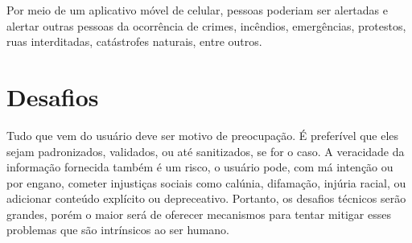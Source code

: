 Por meio de um aplicativo móvel de celular, pessoas poderiam ser alertadas e alertar outras pessoas da ocorrência de crimes, incêndios, emergências, protestos, ruas interditadas, catástrofes naturais, entre outros.

\section{Desafios}
\label{s.desafios}

Tudo que vem do usuário deve ser motivo de preocupação. É preferível que eles sejam padronizados, validados, ou até sanitizados, se for o caso. A veracidade da informação fornecida também é um risco, o usuário pode, com má intenção ou por engano, cometer injustiças sociais como calúnia, difamação, injúria racial, ou adicionar conteúdo explícito ou depreceativo. Portanto, os desafios técnicos serão grandes, porém o maior será de oferecer mecanismos para tentar mitigar esses problemas que são intrínsicos ao ser humano.
